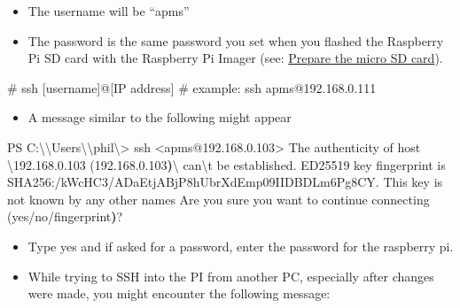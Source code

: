 \documentclass[
  letterpaper,
]{scrbook}
\newenvironment{Shaded}{\begin{snugshade}}{\end{snugshade}}
\newcommand{\CommentTok}[1]{\textcolor[rgb]{0.37,0.37,0.37}{#1}}
\newcommand{\DataTypeTok}[1]{\textcolor[rgb]{0.68,0.00,0.00}{#1}}
\newcommand{\ErrorTok}[1]{\textcolor[rgb]{0.68,0.00,0.00}{#1}}
\newcommand{\ExtensionTok}[1]{\textcolor[rgb]{0.00,0.23,0.31}{#1}}
\newcommand{\FunctionTok}[1]{\textcolor[rgb]{0.28,0.35,0.67}{#1}}
\newcommand{\KeywordTok}[1]{\textcolor[rgb]{0.00,0.23,0.31}{\textbf{#1}}}
\newcommand{\NormalTok}[1]{\textcolor[rgb]{0.00,0.23,0.31}{#1}}
\newcommand{\OperatorTok}[1]{\textcolor[rgb]{0.37,0.37,0.37}{#1}}
\providecommand{\tightlist}{%
  \setlength{\itemsep}{0pt}\setlength{\parskip}{0pt}}
\begin{document}
\begin{itemize}
  \begin{itemize}
  \item
    The username will be ``apms''
  \item
    The password is the same password you set when you flashed the
    Raspberry Pi SD card with the Raspberry Pi Imager (see:
    \hyperref[Prepareux5cux2520theux5cux2520microux5cux2520SDux5cux2520card]{Prepare
    the micro SD card}).
  \end{itemize}
\end{itemize}

\begin{Shaded}
\begin{Highlighting}[]
\CommentTok{\# ssh [username]@[IP address]}
\CommentTok{\# example:}
\FunctionTok{ssh}\NormalTok{ apms@192.168.0.111}
\end{Highlighting}
\end{Shaded}

\begin{itemize}
\tightlist
\item
  A message similar to the following might appear
\end{itemize}

\begin{Shaded}
\begin{Highlighting}[]
\ExtensionTok{PS}\NormalTok{ C:}\DataTypeTok{\textbackslash{}\textbackslash{}}\NormalTok{Users}\DataTypeTok{\textbackslash{}\textbackslash{}}\NormalTok{phil}\DataTypeTok{\textbackslash{}\textgreater{}}\NormalTok{ ssh }\OperatorTok{\textless{}}\NormalTok{apms@192.168.0.103}\OperatorTok{\textgreater{}}
\ExtensionTok{The}\NormalTok{ authenticity of host }\DataTypeTok{\textbackslash{}\textquotesingle{}}\NormalTok{192.168.0.103 }\ErrorTok{(}\ExtensionTok{192.168.0.103}\KeywordTok{)}\ExtensionTok{\textbackslash{}\textquotesingle{}}\NormalTok{ can}\DataTypeTok{\textbackslash{}\textquotesingle{}}\NormalTok{t be established.}
\ExtensionTok{ED25519}\NormalTok{ key fingerprint is SHA256:/kWcHC3/ADaEtjABjP8hUbrXdEmp09IIDBDLm6Pg8CY.}
\ExtensionTok{This}\NormalTok{ key is not known by any other names}
\ExtensionTok{Are}\NormalTok{ you sure you want to continue connecting }\ErrorTok{(}\ExtensionTok{yes/no/fingerprint}\KeywordTok{)}\ExtensionTok{?}
\end{Highlighting}
\end{Shaded}

\begin{itemize}
\item
  Type yes and if asked for a password, enter the password for the
  raspberry pi.
\item
  While trying to SSH into the PI from another PC, especially after
  changes were made, you might encounter the following message:
\end{itemize}
\end{document}
